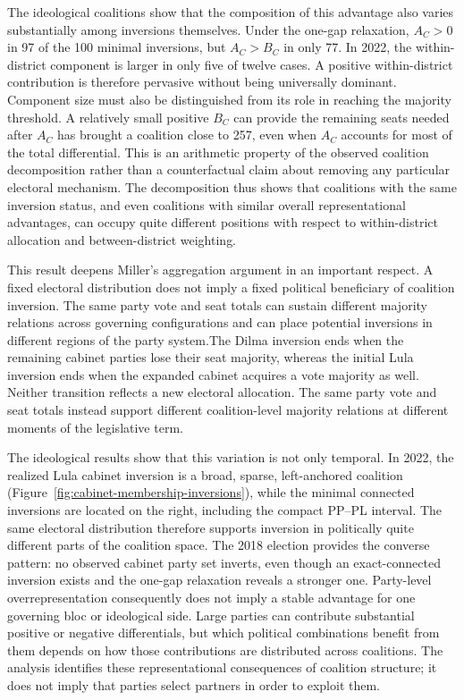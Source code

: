 \documentclass[11pt]{article}
\begin{document}
The ideological coalitions show that the composition of this advantage also
varies substantially among inversions themselves. Under the one-gap
relaxation, \(A_C>0\) in 97 of the 100 minimal inversions, but
\(A_C>B_C\) in only 77. In 2022, the within-district component is larger
in only five of twelve cases. A positive within-district contribution is
therefore pervasive without being universally dominant. Component size
must also be distinguished from its role in reaching the majority threshold.
A relatively small positive \(B_C\) can provide the remaining seats needed
after \(A_C\) has brought a coalition close to 257, even when \(A_C\)
accounts for most of the total differential. This is an arithmetic property
of the observed coalition decomposition rather than a counterfactual claim
about removing any particular electoral mechanism. The decomposition thus
shows that coalitions with the same inversion status, and even coalitions
with similar overall representational advantages, can occupy quite different
positions with respect to within-district allocation and between-district
weighting.

This result deepens Miller's aggregation argument in an important respect. A
fixed electoral distribution does not imply a fixed political beneficiary of
coalition inversion. The same party vote and seat totals can sustain different
majority relations across governing configurations and can place potential
inversions in different regions of the party system.The Dilma inversion ends
when the remaining cabinet parties lose their seat majority, whereas the initial
Lula inversion ends when the expanded cabinet acquires a vote majority as well.
Neither transition reflects a new electoral allocation. The same party vote and
seat totals instead support different coalition-level majority relations at
different moments of the legislative term.

The ideological results show that this variation is not only temporal. In 2022,
the realized Lula cabinet inversion is a broad, sparse, left-anchored coalition
(Figure~\ref{fig:cabinet-membership-inversions}),
while the minimal connected inversions are located on the right, including the
compact PP--PL interval. The same electoral distribution therefore supports
inversion in politically quite different parts of the coalition space. The 2018
election provides the converse pattern: no observed cabinet party set inverts,
even though an exact-connected inversion exists and the one-gap relaxation
reveals a stronger one. Party-level overrepresentation consequently does not
imply a stable advantage for one governing bloc or ideological side. Large
parties can contribute substantial positive or negative differentials, but which
political combinations benefit from them depends on how those contributions are
distributed across coalitions. The analysis identifies these representational
consequences of coalition structure; it does not imply that parties select
partners in order to exploit them.
\end{document}
